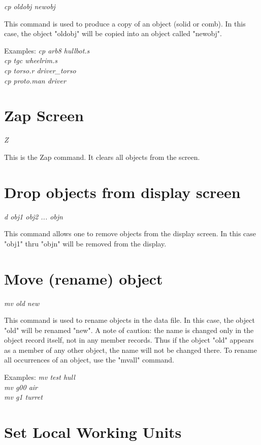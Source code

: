 {\em \center cp oldobj newobj}

This command is used to produce a copy of an object (solid or comb).
In this case, the
object "oldobj" will be copied into an object called "newobj".  

Examples:
{\em
              cp arb8 hullbot.s \\
              cp tgc wheelrim.s \\
              cp torso.r driver\_torso \\
              cp proto.man driver \\
}

\section{Zap Screen}

{\em \center Z}

This is the Zap command.  It clears all objects from the screen.

\section{Drop objects from display screen}

{\em \center d obj1 obj2 ... objn}

This command allows one to remove objects from the display screen.  In
this case "obj1" thru "objn" will be removed from the display.

\section{Move (rename) object}

{\em \center mv old new}

This command is used to rename objects in the data file.  In this
case, the object "old" will be renamed "new".
A note of caution:  the name is changed only in the object record itself, not
in any member records.  Thus if the object "old" appears as a member
of any other object, the name will not be changed there.
To rename all occurrences of an object, use the "mvall" command.

Examples:
{\em
              mv test hull \\
              mv g00 air \\
              mv g1 turret \\
}

\section{Set Local Working Units}

